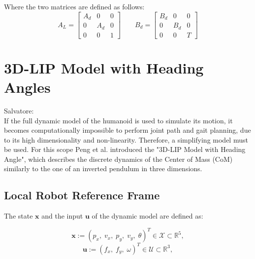 \documentclass[main.tex]{subfiles}
\begin{document}
Where the two matrices are defined as follows:
\begin{equation}
    A_{L} = 
    \begin{bmatrix}
        A_{d} & 0 & 0 \\
        0 & A_{d} & 0 \\
        0 & 0 & 1
    \end{bmatrix}
    \qquad
    B_{d} = 
    \begin{bmatrix}
        B_{d} & 0 & 0 \\
        0 & B_{d} & 0 \\
        0 & 0 & T
    \end{bmatrix}
\end{equation}




\section{3D-LIP Model with Heading Angles}\label{sec:lip}
Salvatore:\\
If the full dynamic model of the humanoid is used to simulate its motion, it becomes computationally impossible to perform joint path and gait planning, due to its high dimensionality and non-linearity. Therefore, a simplifying model must be used. For this scope Peng et al. introduced the "3D-LIP Model with Heading Angle", which describes the discrete dynamics of the Center of Mass (CoM) similarly to the one of an inverted pendulum in three dimensions.

\subsection{Local Robot Reference Frame}
The state $\mathbf{x}$ and the input $\mathbf{u}$ of the dynamic model are defined as:

$$ \mathbf{x} := \left( p_x,\; v_x,\; p_y,\; v_y,\; \theta \right)^T \in \mathcal{X} \subset \mathbb{R}^5 , $$
$$ \mathbf{u} := \left( f_x,\; f_y,\; \omega \right)^T \in \mathcal{U} \subset \mathbb{R}^3 , $$
\end{document}
